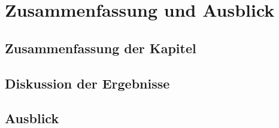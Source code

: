 \chapter{Zusammenfassung und Ausblick}
\section{Zusammenfassung der Kapitel}
\section{Diskussion der Ergebnisse}
\section{Ausblick}